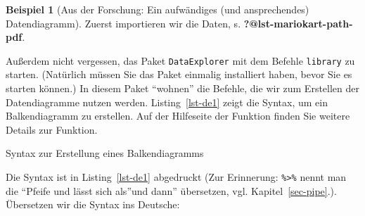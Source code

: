\documentclass[
  a4paper,
]{scrbook}
\newenvironment{Shaded}{\begin{snugshade}}{\end{snugshade}}
\newcommand{\FunctionTok}[1]{\textcolor[rgb]{0.28,0.35,0.67}{#1}}
\newcommand{\NormalTok}[1]{\textcolor[rgb]{0.00,0.23,0.31}{#1}}
\newcommand{\OtherTok}[1]{\textcolor[rgb]{0.00,0.23,0.31}{#1}}
\newcommand{\SpecialCharTok}[1]{\textcolor[rgb]{0.37,0.37,0.37}{#1}}
\theoremstyle{definition}
\newtheorem{example}{Beispiel}[chapter]
\theoremstyle{definition}
\theoremstyle{definition}
\theoremstyle{remark}
\begin{document}
\begin{example}[Aus der Forschung: Ein aufwändiges (und ansprechendes)
Datendiagramm]
Zuerst importieren wir die Daten, s. \textbf{?@lst-mariokart-path-pdf}.

Außerdem nicht vergessen, das Paket \texttt{DataExplorer} mit dem
Befehle \texttt{library} zu starten. (Natürlich müssen Sie das Paket
einmalig installiert haben, bevor Sie es starten können.) In diesem
Paket ``wohnen'' die Befehle, die wir zum Erstellen der Datendiagramme
nutzen werden. Listing~\ref{lst-de1} zeigt die Syntax, um ein
Balkendiagramm zu erstellen. Auf der Hilfeseite der Funktion finden Sie
weitere Details zur Funktion.

\begin{codelisting}

\caption{\label{lst-de1}Syntax zur Erstellung eines Balkendiagramms}

\centering{

\begin{Shaded}
\begin{Highlighting}[]
\FunctionTok{library}\NormalTok{(DataExplorer)}
\NormalTok{mariokart }\OtherTok{\textless{}{-}} \FunctionTok{read.csv}\NormalTok{(mariokart\_path)}

\NormalTok{mariokart }\SpecialCharTok{\%\textgreater{}\%} 
  \FunctionTok{select}\NormalTok{(cond) }\SpecialCharTok{\%\textgreater{}\%} 
  \FunctionTok{plot\_bar}\NormalTok{()}
\end{Highlighting}
\end{Shaded}

}

\end{codelisting}%

\begin{figure}[H]


\caption{\label{fig-de1}}

\end{figure}%

Die Syntax ist in Listing~\ref{lst-de1} abgedruckt (Zur Erinnerung:
\texttt{\%\textgreater{}\%} nennt man die ``Pfeife und lässt sich
als''und dann'' übersetzen, vgl. Kapitel~\ref{sec-pipe}.). Übersetzen
wir die Syntax ins Deutsche:


\end{example}
\end{document}

